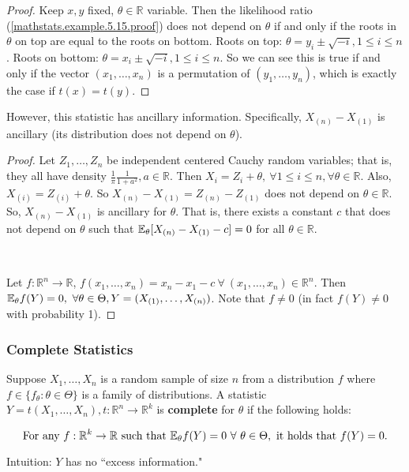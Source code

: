 \begin{example}
\begin{proof}
Keep \(x, y\) fixed, \(\theta \in \mathbb{R}\) variable. Then the likelihood ratio (\ref{mathstats.example.5.15.proof}) does not depend on \(\theta\) if and only if the roots in \(\theta\) on top are equal to the roots on bottom. Roots on top: \(\theta = y_i \pm \sqrt{-i}, 1 \leq i \leq n\). Roots on bottom: \(\theta = x_i \pm \sqrt{-i}, 1 \leq i \leq n\). So we can see this is true if and only if the vector \((x_1, \ldots, x_n)\) is a permutation of \((y_1, \ldots, y_n)\), which is exactly the case if \(t(x) = t(y)\).

\end{proof}

However, this statistic has ancillary information. Specifically, \(X_{(n)} - X_{(1)}\) is ancillary (its distribution does not depend on \(\theta\)).

\begin{proof} Let \(Z_1, \ldots, Z_n\) be independent centered Cauchy random variables; that is, they all have density \(\frac{1}{\pi} \frac{1}{1+a^2}, a \in \mathbb{R}\). Then \(X_i = Z_i + \theta, \ \forall 1 \leq i \leq n, \forall \theta \in \mathbb{R}\). Also, \(X_{(i)} = Z_{(i)} + \theta\). So \(X_{(n)} - X_{(1)} = Z_{(n)} - Z_{(1)}\) does not depend on \(\theta \in \mathbb{R}\). So, \(X_{(n)} - X_{(1)}\) is ancillary for \(\theta\). That is, there exists a constant \(c\) that does not depend on \(\theta\) such that \(\E_\theta[X_{(n)} - X_{(1)} - c] = 0\) for all \(\theta \in \mathbb{R}\). 

\

Let \(f: \mathbb{R}^n \to \mathbb{R}\), \(f(x_1, \ldots, x_n) = x_n - x_1 - c \ \forall \ (x_1, \ldots, x_n) \in \mathbb{R}^n\). Then \(\E_\theta f(Y) = 0, \ \forall \theta \in \Theta, Y  = (X_{(1)}, \ldots, X_{(n)})\). Note that \(f \neq 0\) (in fact \(f(Y) \neq 0\) with probability 1).

\end{proof}

\end{example}

\subsubsection{Complete Statistics}

\begin{definition}Suppose \(X_1, \ldots, X_n\) is a random sample of size \(n\) from a distribution \(f\) where \(f \in \{f_\theta: \theta \in \Theta\}\) is a family of distributions. A statistic \(Y = t(X_1, \ldots, X_n), t: \mathbb{R}^n \to \mathbb{R}^k\) is \textbf{complete} for \(\theta\) if the following holds:

\[
\text{For any } f: \mathbb{R}^k \to \mathbb{R} \text{ such that } \E_\theta f(Y) = 0 \ \forall \ \theta \in \Theta, \text{ it holds that } f(Y) = 0.
\]

Intuition: \(Y\) has no ``excess information."

\end{definition}

